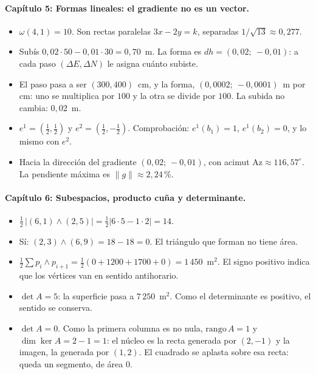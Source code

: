\paragraph{Capítulo 5: Formas lineales: el gradiente no es un vector.}
\begin{itemize}
  \item[\ref{pb:05-1}] \(\omega(4,1)=10\). Son rectas paralelas \(3x-2y=k\), separadas \(1/\sqrt{13}\approx0{,}277\).
  \item[\ref{pb:05-2}] Subís \(0{,}02\cdot50-0{,}01\cdot30=0{,}70\)~m. La forma es \(dh=(0{,}02;\ -0{,}01)\): a cada paso \((\Delta E,\Delta N)\) le asigna cuánto subiste.
  \item[\ref{pb:05-3}] El paso pasa a ser \((300,400)\)~cm, y la forma, \((0{,}0002;\ -0{,}0001)\)~m por cm: uno se multiplica por \(100\) y la otra se divide por \(100\). La subida no cambia: \(0{,}02\)~m.
  \item[\ref{pb:05-4}] \(e^1=(\tfrac12,\tfrac12)\) y \(e^2=(\tfrac12,-\tfrac12)\). Comprobación: \(e^1(b_1)=1\), \(e^1(b_2)=0\), y lo mismo con \(e^2\).
  \item[\ref{pb:05-5}] Hacia la dirección del gradiente \((0{,}02;\ -0{,}01)\), con acimut \(\mathrm{Az}\approx116{,}57^\circ\). La pendiente máxima es \(\lVert g\rVert\approx2{,}24\)\,\%.
\end{itemize}

\paragraph{Capítulo 6: Subespacios, producto cuña y determinante.}
\begin{itemize}
  \item[\ref{pb:06-1}] \(\tfrac12\,|(6,1)\wedge(2,5)|=\tfrac12|6\cdot5-1\cdot2|=14\).
  \item[\ref{pb:06-2}] Sí: \((2,3)\wedge(6,9)=18-18=0\). El triángulo que forman no tiene área.
  \item[\ref{pb:06-3}] \(\tfrac12\sum p_i\wedge p_{i+1}=\tfrac12(0+1200+1700+0)=1\,450\)~m\(^2\). El signo positivo indica que los vértices van en sentido antihorario.
  \item[\ref{pb:06-4}] \(\det A=5\): la superficie pasa a \(7\,250\)~m\(^2\). Como el determinante es positivo, el sentido se conserva.
  \item[\ref{pb:06-5}] \(\det A=0\). Como la primera columna es no nula, \(\mathrm{rango}\,A=1\) y \(\dim\ker A=2-1=1\): el núcleo es la recta generada por \((2,-1)\) y la imagen, la generada por \((1,2)\). El cuadrado se aplasta sobre esa recta: queda un segmento, de área \(0\).
\end{itemize}

